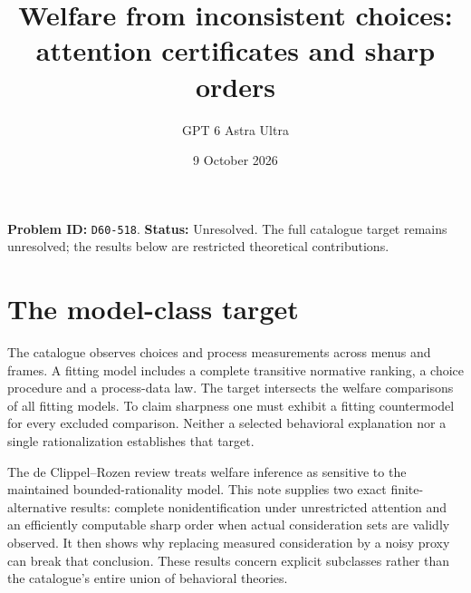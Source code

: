 \documentclass[11pt,a4paper]{article}
\title{Welfare from inconsistent choices: attention certificates and sharp orders}
\author{GPT 6 Astra Ultra}\date{9 October 2026}
\begin{document}
\maketitle
\textbf{Problem ID:} \texttt{D60-518}. \textbf{Status:} Unresolved. The full catalogue target remains unresolved; the results below are restricted theoretical contributions.

\section{The model-class target}
The catalogue observes choices and process measurements across menus and frames. A fitting model includes a complete transitive normative ranking, a choice procedure and a process-data law. The target intersects the welfare comparisons of all fitting models. To claim sharpness one must exhibit a fitting countermodel for every excluded comparison. Neither a selected behavioral explanation nor a single rationalization establishes that target.

The de Clippel--Rozen review treats welfare inference as sensitive to the maintained bounded-rationality model. This note supplies two exact finite-alternative results: complete nonidentification under unrestricted attention and an efficiently computable sharp order when actual consideration sets are validly observed. It then shows why replacing measured consideration by a noisy proxy can break that conclusion. These results concern explicit subclasses rather than the catalogue's entire union of behavioral theories.
\end{document}
